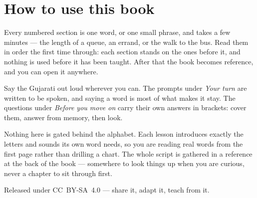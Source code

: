 \documentclass[11pt,twoside]{book}
\begin{document}
\section*{How to use this book}

Every numbered section is one word, or one small phrase, and takes a few
minutes --- the length of a queue, an errand, or the walk to the bus. Read them
in order the first time through: each section stands on the ones before it, and
nothing is used before it has been taught. After that the book becomes
reference, and you can open it anywhere.

Say the Gujarati out loud wherever you can. The prompts under \emph{Your turn}
are written to be spoken, and saying a word is most of what makes it stay. The
questions under \emph{Before you move on} carry their own answers in brackets:
cover them, answer from memory, then look.

Nothing here is gated behind the alphabet. Each lesson introduces exactly the
letters and sounds its own word needs, so you are reading real words from the
first page rather than drilling a chart. The whole script is gathered in a
reference at the back of the book --- somewhere to look things up when you are
curious, never a chapter to sit through first.

Released under CC~BY-SA~4.0 --- share it, adapt it, teach from it.

\tableofcontents

\mainmatter































\backmatter






\end{document}
